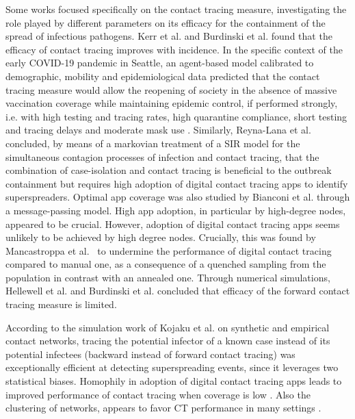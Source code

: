 \documentclass[aps,twocolumn,superscriptaddress,nofootinbib,pre,floatfix]{revtex4-1}
\begin{document}
Some works focused specifically on the contact tracing measure,
investigating the role played by different parameters on its efficacy
for the containment of the spread of infectious pathogens. 
Kerr et al. \cite{Kerr} and Burdinski et al. \cite{Burdinski} found
that the efficacy of contact tracing improves with incidence.
In the specific context of
the early COVID-19 pandemic in Seattle, an agent-based model calibrated to demographic, mobility and epidemiological data predicted that the
contact tracing measure would allow the
reopening of society in the absence of massive vaccination coverage while
maintaining epidemic control, if performed strongly, i.e. with high testing and tracing rates, high quarantine compliance, short testing and tracing delays and moderate mask use \cite{Kerr}.  Similarly, Reyna-Lana et
al. \cite{ReynaLara} concluded, by means of a markovian treatment of a SIR
model for the simultaneous contagion processes of infection and
contact tracing, that the combination of case-isolation and
contact tracing is beneficial to the outbreak containment but requires
high adoption of digital contact tracing apps to identify
superspreaders.  Optimal app coverage was also studied by Bianconi et
al. \cite{Bianconi} through a message-passing model. High app adoption,
in particular by high-degree nodes, appeared to be crucial.
However, adoption of digital contact tracing apps seems unlikely to be
achieved by high degree nodes.
Crucially, this was found by Mancastroppa et
al.~\cite{Mancastroppa21} to undermine the performance of digital
contact tracing compared to manual one, as a consequence of a
quenched sampling from the population in contrast with an annealed one.
Through numerical simulations, Hellewell et al. \cite{Hellewelllancet}
and Burdinski et al. \cite{Burdinski} concluded that
efficacy of the forward contact tracing measure is limited.


According to the simulation work of Kojaku et al. \cite{kojaku21} on
synthetic and empirical contact networks, tracing the potential
infector of a known case instead of its potential infectees (backward
instead of forward contact tracing) was exceptionally efficient at
detecting superspreading events, since it leverages two statistical
biases.  Homophily in adoption of digital contact tracing apps
leads to improved performance of contact tracing
when coverage is low \cite{Rizi, Burgio}.
Also the clustering of networks, appears to favor CT performance
in many settings \cite{House, Burdinski, Kiss}.
\end{document}
